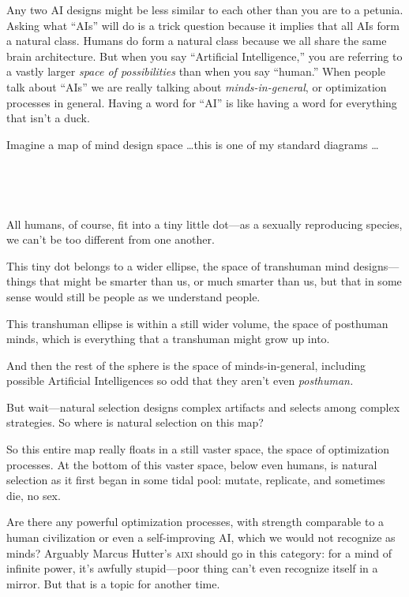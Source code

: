 {
 Any two AI designs might be less similar to each other than you
are to a petunia. Asking what
``AIs'' will do is a trick question
because it implies that all AIs form a natural class. Humans do form a
natural class because we all share the same brain architecture. But
when you say ``Artificial
Intelligence,'' you are referring to a vastly larger
\textit{space of possibilities} than when you say
``human.'' When people talk about
``AIs'' we are really talking about
\textit{minds-in-general}, or optimization processes in general. Having
a word for ``AI'' is like having a
word for everything that isn't a duck.}

{
 Imagine a map of mind design space \ldots this is one of my
standard diagrams \ldots}

{
 ~}

{\centering
{}

\par}


\bigskip

{
 ~}

{
 All humans, of course, fit into a tiny little dot---as a sexually
reproducing species, we can't be too different from one
another.}

{
 This tiny dot belongs to a wider ellipse, the space of transhuman
mind designs---things that might be smarter than us, or much smarter
than us, but that in some sense would still be people as we understand
people.}

{
 This transhuman ellipse is within a still wider volume, the space
of posthuman minds, which is everything that a transhuman might grow up
into.}

{
 And then the rest of the sphere is the space of minds-in-general,
including possible Artificial Intelligences so odd that they
aren't even \textit{posthuman.}}

{
 But wait---natural selection designs complex artifacts and selects
among complex strategies. So where is natural selection on this map?}

{
 So this entire map really floats in a still vaster space, the
space of optimization processes. At the bottom of this vaster space,
below even humans, is natural selection as it first began in some tidal
pool: mutate, replicate, and sometimes die, no sex.}

{
 Are there any powerful optimization processes, with strength
comparable to a human civilization or even a self-improving AI, which
we would not recognize as minds? Arguably Marcus
Hutter's \textsc{aixi} should go in this category: for a mind of
infinite power, it's awfully stupid---poor thing
can't even recognize itself in a mirror. But that is a
topic for another time.}

